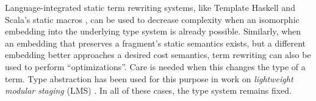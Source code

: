 \documentclass[pldi]{sigplanconf-pldi15}
\begin{document}
Language-integrated static term rewriting systems, like Template Haskell \cite{SheardPeytonJones:Haskell-02} and Scala's static macros \cite{ScalaMacros2013}, can be used to decrease complexity when an isomorphic embedding into the underlying type system is already possible. %
Similarly, when an embedding that preserves a fragment's static semantics exists, but a different  embedding better approaches a desired cost semantics, term rewriting  can also be used to perform ``optimizations''. Care is needed when this changes the type of a term. Type abstraction has been used for this purpose in work on \emph{lightweight modular staging} (LMS) \cite{Rompf:2012:LMS}. In all of these cases, the type system remains fixed.
\end{document}
